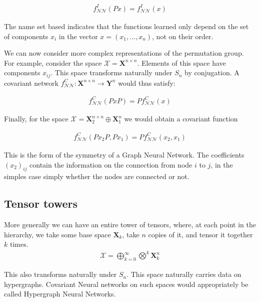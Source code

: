 \documentclass[reprint,twocolumn,amsmath,amssymb,aps]{revtex4-1}
\newcommand{\NN}{\mathcal{NN}}
\newcommand{\XX}{\mathcal{X}}
\newcommand{\X}{\mathbf{X}}
\newcommand{\Y}{\mathbf{Y}}
\begin{document}
\begin{align}
f^I_\NN(P x) = f^I_\NN(x)
\end{align}

The name set based indicates that the functions learned only depend on the set of components $x_i$ in the vector $x = (x_1, \dots, x_n)$, not on their order.

We can now consider more complex representations of the permutation group. For example, consider the space $\XX = \X^{n \times n}$. Elements of this space have components $x_{ij}$. This space transforms naturally under $S_n$ by conjugation. A covariant network $f^C_\NN: \X^{n \times n} \rightarrow \Y^n$ would thus satisfy:

\begin{align}
f^C_\NN(P x P) = P f^C_\NN(x)
\end{align}

Finally, for the space $\XX = \X_2^{n \times n} \oplus \X_1^{n}$ we would obtain a covariant function

\begin{align}
f^C_\NN(P x_2 P, P x_1) = P f^C_\NN(x_2, x_1)
\end{align}

This is the form of the symmetry of a Graph Neural Network. The coefficients $(x_2)_{ij}$ contain the information on the connection from node $i$ to $j$, in the simples case simply whether the nodes are connected or not.

\subsection{Tensor towers}

More generally we can have an entire tower of tensors, where, at each point in the hierarchy, we take some base space $\X_k$, take $n$ copies of it, and tensor it together $k$ times.
\begin{align}
\XX = \bigoplus_{k=0}^{\infty} \bigotimes^k \X_k^n
\end{align}

This also transforms naturally under $S_n$. This space naturally carries data on hypergraphs. Covariant Neural networks on such spaces would appropriately be called Hypergraph Neural Networks.


\end{document}
